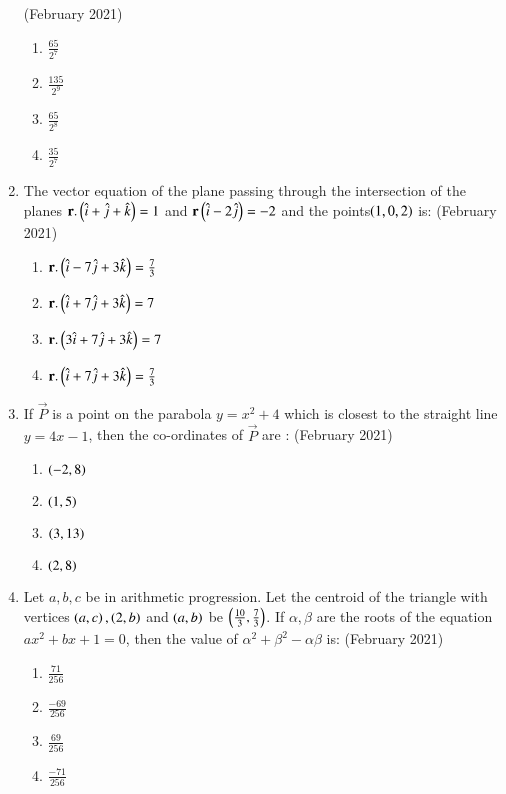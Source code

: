 \documentclass[journal,12pt,onecolumn]{IEEEtran}
\theoremstyle{remark}
\begin{document}
\begin{enumerate}
    \hfill{(February 2021)} 
	\begin{enumerate}
        \item $\frac{65}{2^{7}}$
        \item $\frac{135}{2^{9}}$
        \item $\frac{65}{2^{8}}$
        \item $\frac{35}{2^{7}}$
    \end{enumerate}
    \item The vector equation of the plane passing through the intersection of the planes $\mathbf{r}.\left(\hat{i}+\hat{j}+\hat{k}\right)=1$ and $\mathbf{r}\left(\hat{i}-2\hat{j}\right)=-2$ and the points$\left(1,0,2\right)$ is:
  \hfill{(February 2021)} 
	\begin{enumerate}
        \item $\mathbf{r}.\left(\hat{i}-7\hat{j}+3\hat{k}\right)=\frac{7}{3}$
        \item $\mathbf{r}.\left(\hat{i}+7\hat{j}+3\hat{k}\right)=7$
        \item $\mathbf{r}.\left(3\hat{i}+7\hat{j}+3\hat{k}\right)=7$
        \item $\mathbf{r}.\left(\hat{i}+7\hat{j}+3\hat{k}\right)=\frac{7}{3}$
    \end{enumerate}
    \item If $\vec{P}$ is a point on the parabola $y = x^2 + 4$ which is closest to the straight line $y = 4x-1$, then the co-ordinates of $\vec{P}$ are :
    \hfill{(February 2021)} 
	\begin{enumerate}
        \item $\left(-2,8\right)$
        \item $\left(1,5\right)$
        \item $\left(3,13\right)$
        \item $\left(2,8\right)$
    \end{enumerate}
    \item Let $a, b, c$ be in arithmetic progression. Let the centroid of the triangle with vertices $\left(a, c\right), \left(2, b\right)$ and $\left(a, b\right)$ be $\left(\frac{10}{3}, \frac{7}{3}\right)$. If $\alpha,\beta$ are the roots of the equation $ax^2 + bx + 1 = 0$, then the value of $\alpha^2 + \beta^2 - \alpha\beta$ is:
    \hfill{(February 2021)} 
	\begin{enumerate}
        \item $\frac{71}{256}$
        \item $\frac{-69}{256}$
        \item $\frac{69}{256}$
        \item $\frac{-71}{256}$ 
    \end{enumerate}

\end{enumerate}
\end{document}
